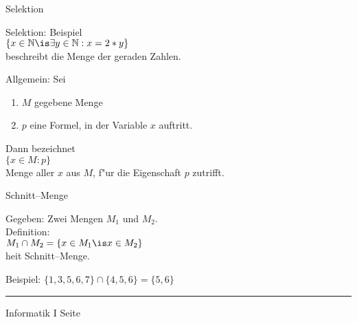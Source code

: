 \begin{slide}{}
\normalsize
\begin{center}
Selektion
\end{center}
\vspace{0.5cm}

\footnotesize
Selektion: Beispiel \\[0.3cm]
\hspace*{1.3cm} $\{ x \in \mathbb{N} \is \exists y \in \mathbb{N}: x = 2 * y \}$  \\[0.6cm]
beschreibt die Menge der geraden Zahlen.


Allgemein: Sei
\begin{enumerate}
\item $M$ gegebene Menge
\item $p$ eine Formel, in der Variable $x$ auftritt.
\end{enumerate}
Dann bezeichnet \\[0.3cm]
\hspace*{1.3cm} $\{ x \in M : p \}$ \\[0.3cm]
Menge aller $x$ aus $M$, f"ur die Eigenschaft $p$ zutrifft.

\begin{center}
\normalsize
  Schnitt--Menge
\end{center}
\footnotesize

Gegeben: Zwei Mengen $M_1$ und $M_2$.  \\
Definition: \\[0.3cm]
\hspace*{1.3cm} $M_1 \cap M_2 = \{ x \in M_1 \is x \in M_2 \}$  \\[0.3cm]
hei\3t Schnitt--Menge.

Beispiel:  $\{1, 3, 5, 6, 7 \} \cap \{4, 5, 6 \} = \{ 5, 6 \}$

\vspace*{\fill}
\tiny \addtocounter{mypage}{1}
\rule{15cm}{1mm}
Informatik I  \hspace*{\fill} Seite 
\end{slide}


